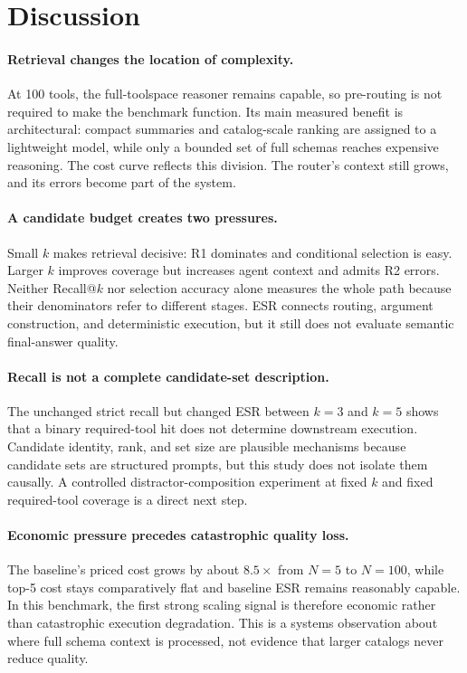 \documentclass[10pt,twocolumn]{article}
\begin{document}
\section{Discussion}
\label{sec:discussion}

\paragraph{Retrieval changes the location of complexity.}
At 100 tools, the full-toolspace reasoner remains capable, so pre-routing is not required to make the benchmark function. Its main measured benefit is architectural: compact summaries and catalog-scale ranking are assigned to a lightweight model, while only a bounded set of full schemas reaches expensive reasoning. The cost curve reflects this division. The router's context still grows, and its errors become part of the system.

\paragraph{A candidate budget creates two pressures.}
Small $k$ makes retrieval decisive: R1 dominates and conditional selection is easy. Larger $k$ improves coverage but increases agent context and admits R2 errors. Neither Recall@$k$ nor selection accuracy alone measures the whole path because their denominators refer to different stages. ESR connects routing, argument construction, and deterministic execution, but it still does not evaluate semantic final-answer quality.

\paragraph{Recall is not a complete candidate-set description.}
The unchanged strict recall but changed ESR between $k=3$ and $k=5$ shows that a binary required-tool hit does not determine downstream execution. Candidate identity, rank, and set size are plausible mechanisms because candidate sets are structured prompts, but this study does not isolate them causally. A controlled distractor-composition experiment at fixed $k$ and fixed required-tool coverage is a direct next step.

\paragraph{Economic pressure precedes catastrophic quality loss.}
The baseline's priced cost grows by about $8.5\times$ from $N=5$ to $N=100$, while top-5 cost stays comparatively flat and baseline ESR remains reasonably capable. In this benchmark, the first strong scaling signal is therefore economic rather than catastrophic execution degradation. This is a systems observation about where full schema context is processed, not evidence that larger catalogs never reduce quality.
\end{document}
